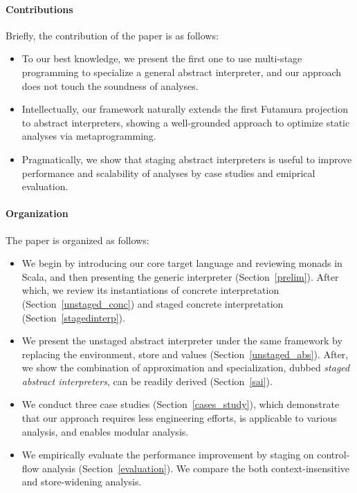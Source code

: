 \paragraph{Contributions} Briefly, the contribution of the paper is as follows:
\begin{itemize}[leftmargin=2em]
  \item To our best knowledge, we present the first one to use
    multi-stage programming to specialize a general abstract interpreter,
    and our approach does not touch the soundness of analyses.
  \item Intellectually, our framework naturally extends the first
    Futamura projection to abstract interpreters, showing a
    well-grounded approach to optimize static analyses via
    metaprogramming.
  \item Pragmatically, we show that staging abstract interpreters is
    useful to improve performance and scalability of analyses by case
    studies and emiprical evaluation.
\end{itemize}

\paragraph{Organization} The paper is organized as follows:
\begin{itemize}[leftmargin=2em]
  \item We begin by introducing our core target language and reviewing
    monads in Scala, and then presenting the generic interpreter (Section~\ref{prelim}).
    After which, we review its instantiations of concrete interpretation
    (Section~\ref{unstaged_conc}) and staged concrete interpretation
    (Section~\ref{stagedinterp}).
  \item We present the unstaged abstract interpreter under the same framework by
    replacing the environment, store and values (Section~\ref{unstaged_abs}).
    After, we show the combination of approximation and specialization, dubbed
    \textit{staged abstract interpreters}, can be readily derived (Section~\ref{sai}).
  \item We conduct three case studies (Section~\ref{cases_study}), which demonstrate that
    our approach requires less engineering efforts, is applicable to various analysis,
    and enables modular analysis.
  \item We empirically evaluate the performance improvement by staging on
    control-flow analysis (Section~\ref{evaluation}). We compare the both
    context-insensitive and store-widening analysis.
\end{itemize}

\iffalse
On the other side, static analysis is a tradeoff between performance and
precision: higher precision usually leads to longer running time.

4. Existing method to improve the performance is adhoc, engineering heavy, require to rewrite the optimized version, therefore harder to reason about the correctness
6. program analyzers are also meta-programs, they manipulate other programs as data objects
\fi
